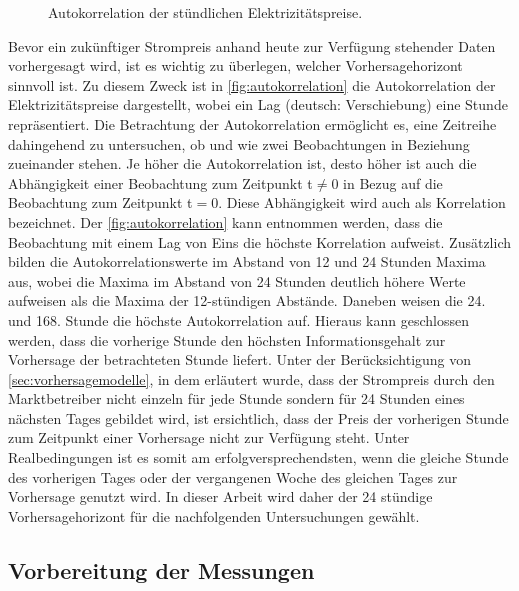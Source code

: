 \begin{figure}[!htb]
    \centering
        
    \caption{Autokorrelation der stündlichen Elektrizitätspreise.}
    \label{fig:autokorrelation}
\end{figure}

Bevor ein zukünftiger Strompreis anhand heute zur Verfügung stehender Daten vorhergesagt wird, ist es wichtig zu überlegen, welcher Vorhersagehorizont sinnvoll ist.
Zu diesem Zweck ist in \autoref{fig:autokorrelation} die Autokorrelation der Elektrizitätspreise dargestellt, wobei ein Lag (deutsch: Verschiebung) eine Stunde repräsentiert. Die Betrachtung der Autokorrelation ermöglicht es, eine Zeitreihe dahingehend zu untersuchen, ob und wie zwei Beobachtungen in Beziehung zueinander stehen. Je höher die Autokorrelation ist, desto höher ist auch die Abhängigkeit einer Beobachtung zum Zeitpunkt t$\neq$0 in Bezug auf die Beobachtung zum Zeitpunkt t$=$0. Diese Abhängigkeit wird auch als Korrelation bezeichnet. Der \autoref{fig:autokorrelation} kann entnommen werden, dass die Beobachtung mit einem Lag von Eins die höchste Korrelation aufweist. Zusätzlich bilden die Autokorrelationswerte im Abstand von 12 und 24 Stunden Maxima aus, wobei die Maxima im Abstand von 24 Stunden deutlich höhere Werte aufweisen als die Maxima der 12-stündigen Abstände. Daneben weisen die 24. und 168. Stunde die höchste Autokorrelation auf. 
Hieraus kann geschlossen werden, dass die vorherige Stunde den höchsten Informationsgehalt zur Vorhersage der betrachteten Stunde liefert. Unter der Berücksichtigung von \autoref{sec:vorhersagemodelle}, in dem erläutert wurde, dass der Strompreis durch den Marktbetreiber nicht einzeln für jede Stunde sondern für 24 Stunden eines nächsten Tages gebildet wird, ist ersichtlich, dass der Preis der vorherigen Stunde zum Zeitpunkt einer Vorhersage nicht zur Verfügung steht. Unter Realbedingungen ist es somit am erfolgversprechendsten, wenn die gleiche Stunde des vorherigen Tages oder der vergangenen Woche des gleichen Tages zur Vorhersage genutzt wird. In dieser Arbeit wird daher der 24 stündige Vorhersagehorizont für die nachfolgenden Untersuchungen gewählt.

\subsection{Vorbereitung der Messungen}

